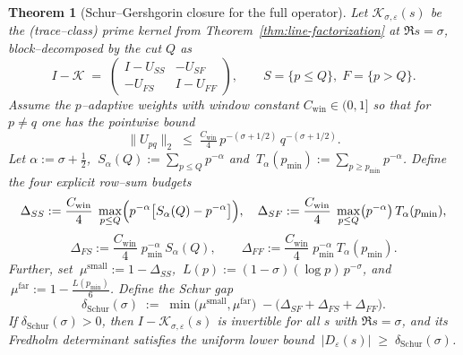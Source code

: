\documentclass[11pt]{article}
\newtheorem{theorem}{Theorem}
\theoremstyle{definition}
\theoremstyle{remark}
\begin{document}
\begin{theorem}[Schur--Gershgorin closure for the full operator]\label{thm:schur-closure}
Let $\mathcal K_{\sigma,\varepsilon}(s)$ be the (trace--class) prime kernel from Theorem~\ref{thm:line-factorization} at $\Re s=\sigma$, block--decomposed by the cut $Q$ as
\[
 I-\mathcal K
 \;=\;
 \begin{pmatrix}
   I-U_{SS} & -U_{SF} \\
   -U_{FS}  & I-U_{FF}
 \end{pmatrix},
\qquad
 S=\{p\le Q\},\;F=\{p>Q\}.
\]
Assume the $p$--adaptive weights with window constant $C_{\mathrm{win}}\in(0,1]$ so that for $p\neq q$ one has the pointwise bound
\[
  \|U_{pq}\|_2\;\le\;\tfrac{C_{\mathrm{win}}}{4}\,p^{-(\sigma+1/2)}\,q^{-(\sigma+1/2)}.
\]
Let $\alpha:=\sigma+\tfrac12$, $\ S_{\alpha}(Q):=\sum_{p\le Q} p^{-\alpha}$ and $\ T_{\alpha}(p_{\min}):=\sum_{p\ge p_{\min}} p^{-\alpha}$. Define the four explicit row--sum budgets
\[
\Delta_{SS}:=\frac{C_{\mathrm{win}}}{4}\;\max_{p\le Q}
          \Bigl(p^{-\alpha}\bigl[S_{\alpha}(Q)-p^{-\alpha}\bigr]\Bigr),\quad
\Delta_{SF}:=\frac{C_{\mathrm{win}}}{4}\;\max_{p\le Q}\bigl(p^{-\alpha}\bigr)\,T_{\alpha}(p_{\min}),
\]
\[
\Delta_{FS}:=\frac{C_{\mathrm{win}}}{4}\;p_{\min}^{-\alpha}\,S_{\alpha}(Q),\qquad
\Delta_{FF}:=\frac{C_{\mathrm{win}}}{4}\;p_{\min}^{-\alpha}\,T_{\alpha}(p_{\min}).
\]
Further, set $\ \mu^{\mathrm{small}}:=1-\Delta_{SS}$, $\ L(p):=(1-\sigma)(\log p)\,p^{-\sigma}$, and $\ \mu^{\mathrm{far}}:=1-\tfrac{L(p_{\min})}{6}$. Define the Schur gap
\[
  \delta_{\mathrm{Schur}}(\sigma)
   \;:=\;
   \min\bigl(\mu^{\mathrm{small}},\mu^{\mathrm{far}}\bigr)
   \;-
   \bigl(\Delta_{SF}+\Delta_{FS}+\Delta_{FF}\bigr).
\]
If $\delta_{\mathrm{Schur}}(\sigma)>0$, then $I-\mathcal K_{\sigma,\varepsilon}(s)$ is invertible for all $s$ with $\Re s=\sigma$, and its Fredholm determinant satisfies the uniform lower bound $\ |D_{\varepsilon}(s)| \;\ge\; \delta_{\mathrm{Schur}}(\sigma)$.
\end{theorem}
\end{document}
